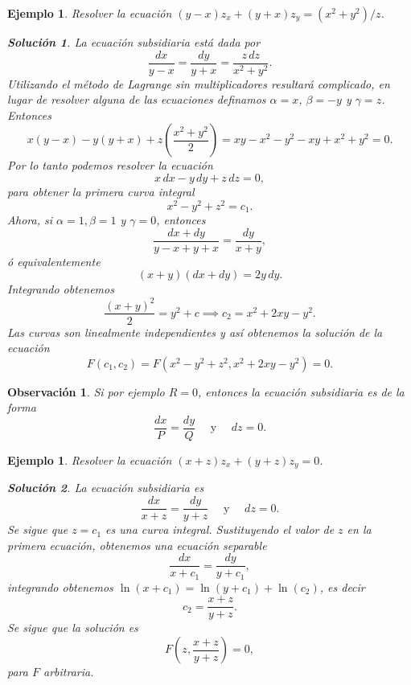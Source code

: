 \documentclass[11pt,letterpaper]{report}
\newtheorem{example}[defn]{Ejemplo}
\newtheorem*{sol}{Solución}
\newtheorem{obs}[defn]{Observación}
\newcommand\<{\langle}
\renewcommand\>{\rangle}
\begin{document}
\begin{example}
  Resolver la ecuación $(y-x) z_x + (y+x) z_y = (x^2+y^2) /
  z$.
  \begin{sol}
    La ecuación subsidiaria está dada por
    \[
    \frac{dx}{y-x} = \frac{dy}{y+x} = \frac{z \,
    dz}{x^2+y^2}.
    \] 
    Utilizando el método de Lagrange sin multiplicadores
    resultará complicado, en lugar de resolver alguna de las
    ecuaciones definamos $\alpha = x$, $\beta = -y$ y
    $\gamma = z$. Entonces
    \[
    x(y-x) - y(y+x) + z\left(\frac{x^2+y^2}{2}\right) = xy -
    x^2 - y^2 - xy + x^2 + y^2 = 0.
    \]
    Por lo tanto podemos resolver la ecuación
    \[
    x \, dx - y \, dy + z \, dz = 0,
    \] 
    para obtener la primera curva integral
    \[
    x^2 - y^2 + z^2 = c_1.
    \] 
    Ahora, si $\alpha = 1, \beta = 1$ y $\gamma = 0$,
    entonces
    \[
    \frac{dx + dy}{y - x + y + x} = \frac{dy}{x + y},
    \] 
    ó equivalentemente
    \[
      (x+y)(dx + dy) = 2y \, dy.
    \] 
    Integrando obtenemos
    \[
    \frac{(x+y)^2}{2} = y^2 + c \implies c_2 = x^2 + 2xy -
    y^2.
    \] 
    Las curvas son linealmente independientes y así
    obtenemos la solución de la ecuación 
    \[
    F(c_1,c_2) = F\left(x^2 - y^2 +
      z^2, x^2 + 2xy - y^2\right) = 0.
    \] 
  \end{sol}
\end{example}

\begin{obs}
  Si por ejemplo $R = 0$, entonces la ecuación subsidiaria
  es de la forma
  \[
  \frac{dx}{P} = \frac{dy}{Q} \quad \text{ y } \quad dz = 0.
  \] 
\end{obs}

\begin{example}
  Resolver la ecuación $(x+z) z_x + (y+z) z_y = 0$.
  \begin{sol}
    La ecuación subsidiaria es
    \[
    \frac{dx}{x+z} = \frac{dy}{y+z} \quad \text{ y } \quad
    dz = 0.
    \] 
    Se sigue que $z = c_1$ es una curva integral.
    Sustituyendo el valor de $z$ en la primera ecuación,
    obtenemos una ecuación separable
    \[
    \frac{dx}{x+c_1} = \frac{dy}{y+c_1},
    \]
    integrando obtenemos $\ln(x+c_1) = \ln(y+c_1) +
    \ln(c_2)$, es decir
    \[
    c_2 = \frac{x+z}{y+z}.
    \] 
    Se sigue que la solución es
    \[
    F\left(z, \frac{x+z}{y+z}\right) = 0,
    \] 
    para $F$ arbitraria.
  \end{sol}
\end{example}
\end{document}
